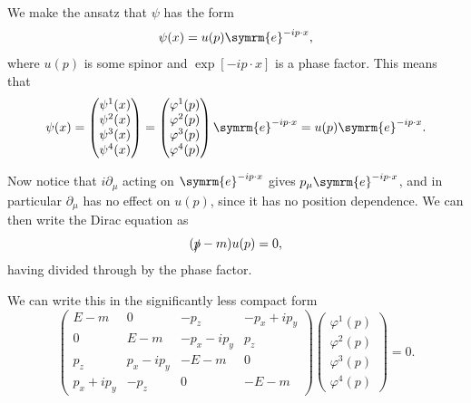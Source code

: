 \documentclass[fleqn]{NotesClass}
\newcommand{\e}{\symrm{e}}
\begin{document}
    We make the ansatz that \(\psi\) has the form
    \begin{equation}
        \psi(x) = u(p) \e^{-ip\cdot x},
    \end{equation}
    where \(u(p)\) is some spinor and \(\exp[-ip\cdot x]\) is a phase factor.
    This means that
    \begin{equation}
        \psi(x) = 
        \begin{pmatrix}
            \psi^1(x)\\ \psi^2(x)\\ \psi^3(x)\\ \psi^4(x)
        \end{pmatrix}
        =
        \begin{pmatrix}
            \varphi^1(p)\\ \varphi^2(p)\\ \varphi^3(p)\\ \varphi^4(p)
        \end{pmatrix}
        \e^{-ip\cdot x} = u(p)\e^{-ip\cdot x}.
    \end{equation}
    
    Now notice that \(i\partial_\mu\) acting on \(\e^{-ip\cdot x}\) gives \(p_\mu \e^{-ip\cdot x}\), and in particular \(\partial_\mu\) has no effect on \(u(p)\), since it has no position dependence.
    We can then write the Dirac equation as
    \begin{equation}
        (\slashed{p} - m)u(p) = 0,
    \end{equation}
    having divided through by the phase factor.
    
    We can write this in the significantly less compact form
    \begin{equation}
        \begin{pmatrix}
            E - m & 0 & -p_z & -p_x + ip_y\\
            0 & E - m & -p_x - ip_y & p_z\\
            p_z & p_x - ip_y & -E - m & 0\\
            p_x + ip_y & -p_z & 0 & -E - m
        \end{pmatrix}	
        \begin{pmatrix}
            \varphi^1(p)\\ \varphi^2(p)\\ \varphi^3(p)\\ \varphi^4(p)
        \end{pmatrix}
        = 0.
    \end{equation}
    
\end{document}
